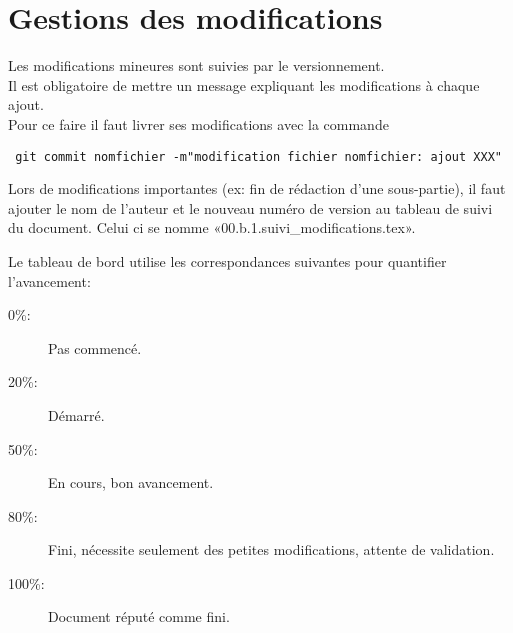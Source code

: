 \section{Gestions des modifications}

Les modifications mineures sont suivies par le versionnement.\\
Il est obligatoire de mettre un message
expliquant les modifications à chaque ajout.\\
Pour ce faire il faut livrer ses modifications avec la commande
\begin{verbatim}
 git commit nomfichier -m"modification fichier nomfichier: ajout XXX"
\end{verbatim}
Lors de modifications importantes (ex: fin de rédaction d'une
sous-partie), il faut ajouter le nom de l'auteur
et le nouveau numéro de version au tableau de suivi du document.
Celui ci se nomme «00.b.1.suivi\_modifications.tex».


Le tableau de bord utilise les correspondances suivantes pour quantifier
l'avancement:
\begin{description}
    \item[0\%:]  Pas commencé.
    \item[20\%:] Démarré.
    \item[50\%:] En cours, bon avancement.
    \item[80\%:] Fini, nécessite seulement des petites modifications,
                    attente de validation.
    \item[100\%:]Document réputé comme fini.
\end{description}
